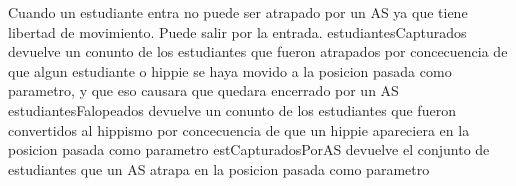 \documentclass[10pt, a4paper]{article}
\begin{document}
Cuando un estudiante entra no puede ser atrapado por un AS ya que tiene libertad de movimiento. Puede salir por la entrada.
\newline estudiantesCapturados devuelve un conunto de los estudiantes que fueron atrapados por concecuencia de que algun estudiante o hippie se haya movido a la posicion pasada como parametro, y que eso causara que quedara encerrado por un AS
\newline estudiantesFalopeados devuelve un conunto de los estudiantes que fueron convertidos al hippismo por concecuencia de que un hippie apareciera en la posicion pasada como parametro
\newline estCapturadosPorAS devuelve el conjunto de estudiantes que un AS atrapa en la posicion pasada como parametro
\end{document}
